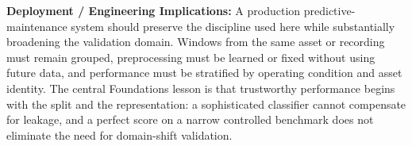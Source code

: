 \textbf{Deployment / Engineering Implications:} A production predictive-maintenance system should preserve the discipline used here while substantially broadening the validation domain. Windows from the same asset or recording must remain grouped, preprocessing must be learned or fixed without using future data, and performance must be stratified by operating condition and asset identity. The central Foundations lesson is that trustworthy performance begins with the split and the representation: a sophisticated classifier cannot compensate for leakage, and a perfect score on a narrow controlled benchmark does not eliminate the need for domain-shift validation.
